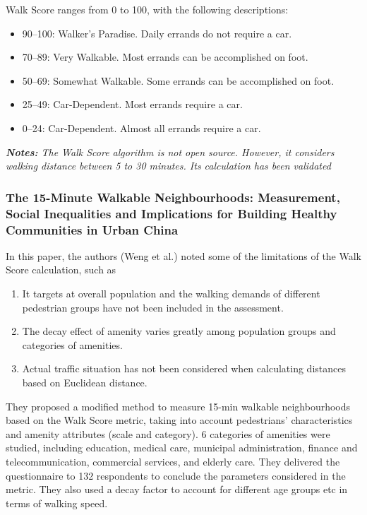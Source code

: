 Walk Score ranges from 0 to 100, with the following descriptions:

\begin{itemize}
    \item 90–100: Walker’s Paradise. Daily errands do not require a car.
    \item 70–89: Very Walkable. Most errands can be accomplished on foot.
    \item 50–69: Somewhat Walkable. Some errands can be accomplished on foot.
    \item 25–49: Car-Dependent. Most errands require a car.
    \item 0–24: Car-Dependent. Almost all errands require a car.
\end{itemize}

\textit{\textbf{Notes:} The Walk Score algorithm is not open source. However, it considers walking distance between 5 to 30 minutes. Its calculation has been validated \cite{carr_validation_2011}}

\subsubsection{The 15-Minute Walkable Neighbourhoods: Measurement, Social Inequalities and Implications for Building Healthy Communities in Urban China \texorpdfstring{\cite{weng_15-minute_2019}}{}} \label{weng_15-minute_2019}

In this paper, the authors (Weng et al.) noted some of the limitations of the Walk Score calculation, such as

\begin{enumerate}
    \item It targets at overall population and the walking demands of different pedestrian groups have not been included in the assessment.
    \item The decay effect of amenity varies greatly among population groups and categories of amenities.
    \item Actual traffic situation has not been considered when calculating distances based on Euclidean distance.
\end{enumerate}

They proposed a modified method to measure 15-min walkable neighbourhoods based on the Walk Score metric, taking into account pedestrians’ characteristics and amenity attributes (scale and category). 6 categories of amenities were studied, including education, medical care, municipal administration, finance and telecommunication, commercial services, and elderly care. They delivered the questionnaire to 132 respondents to conclude the parameters considered in the metric. They also used a decay factor to account for different age groups etc in terms of walking speed.

